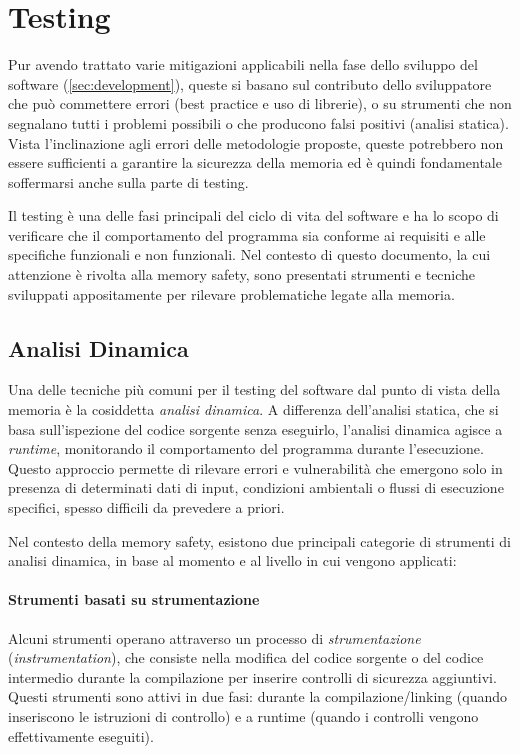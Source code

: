 \section{Testing}
\label{sec:testing}

Pur avendo trattato varie mitigazioni applicabili nella fase dello sviluppo del software
(\autoref{sec:development}), queste si basano sul contributo dello sviluppatore
che può commettere errori (best practice e uso di librerie), o su strumenti che non
segnalano tutti i problemi possibili o che producono falsi positivi (analisi
statica). Vista l'inclinazione agli errori delle metodologie proposte, queste potrebbero
non essere sufficienti a garantire la sicurezza della memoria ed è quindi fondamentale
soffermarsi anche sulla parte di testing.

Il testing è una delle fasi principali del ciclo di vita del software e ha lo scopo
di verificare che il comportamento del programma sia conforme ai requisiti e alle
specifiche funzionali e non funzionali. Nel contesto di questo documento, la cui
attenzione è rivolta alla memory safety, sono presentati strumenti e tecniche
sviluppati appositamente per rilevare problematiche legate alla memoria.

\subsection{Analisi Dinamica}
\label{sec:analisi-dinamica}

Una delle tecniche più comuni per il testing del software dal punto di vista della
memoria è la cosiddetta \textit{analisi dinamica}. A differenza dell'analisi statica,
che si basa sull'ispezione del codice sorgente senza eseguirlo, l'analisi dinamica
agisce a \textit{runtime}, monitorando il comportamento del programma durante l'esecuzione.
Questo approccio permette di rilevare errori e vulnerabilità che emergono solo
in presenza di determinati dati di input, condizioni ambientali o flussi di esecuzione
specifici, spesso difficili da prevedere a priori.

Nel contesto della memory safety, esistono due principali categorie di strumenti
di analisi dinamica, in base al momento e al livello in cui vengono applicati:

\paragraph{Strumenti basati su strumentazione}
Alcuni strumenti operano attraverso un processo di \textit{strumentazione} (\textit{instrumentation}),
che consiste nella modifica del codice sorgente o del codice intermedio durante
la compilazione per inserire controlli di sicurezza aggiuntivi. Questi strumenti
sono attivi in due fasi: durante la compilazione/linking (quando inseriscono le istruzioni
di controllo) e a runtime (quando i controlli vengono effettivamente eseguiti).

